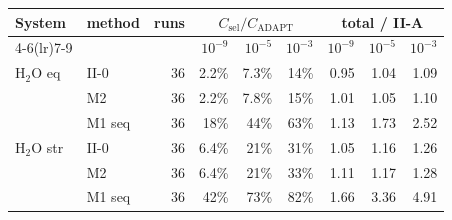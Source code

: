 \begin{tabular}{@{}llrrrrrrr@{}}
\toprule
System & method & runs & \multicolumn{3}{c}{$C_{\mathrm{sel}}/C_{\mathrm{ADAPT}}$} & \multicolumn{3}{c}{total / II-A} \\
\cmidrule(lr){4-6}\cmidrule(lr){7-9}
 & & & $10^{-9}$ & $10^{-5}$ & $10^{-3}$ & $10^{-9}$ & $10^{-5}$ & $10^{-3}$ \\
\midrule
H$_2$O eq & II-0 & 36 & 2.2\% & 7.3\% & 14\% & 0.95 & 1.04 & 1.09 \\
 & M2 & 36 & 2.2\% & 7.8\% & 15\% & 1.01 & 1.05 & 1.10 \\
 & M1 seq & 36 & 18\% & 44\% & 63\% & 1.13 & 1.73 & 2.52 \\
H$_2$O str & II-0 & 36 & 6.4\% & 21\% & 31\% & 1.05 & 1.16 & 1.26 \\
 & M2 & 36 & 6.4\% & 21\% & 33\% & 1.11 & 1.17 & 1.28 \\
 & M1 seq & 36 & 42\% & 73\% & 82\% & 1.66 & 3.36 & 4.91 \\
\bottomrule
\end{tabular}
